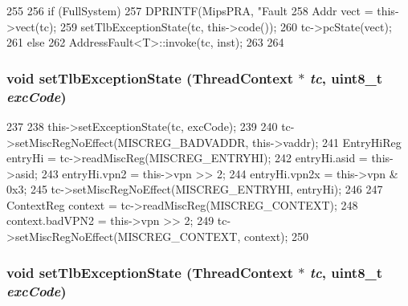 \begin{DoxyCode}
255     {
256         if (FullSystem) {
257             DPRINTF(MipsPRA, "Fault %
258             Addr vect = this->vect(tc);
259             setTlbExceptionState(tc, this->code());
260             tc->pcState(vect);
261         } else {
262             AddressFault<T>::invoke(tc, inst);
263         }
264     }
\end{DoxyCode}
\hypertarget{classMipsISA_1_1TlbFault_a063e32df265a515397ce13a84a741fed}{
\subsubsection[{setTlbExceptionState}]{\setlength{\rightskip}{0pt plus 5cm}void setTlbExceptionState ({\bf ThreadContext} $\ast$ {\em tc}, \/  uint8\_\-t {\em excCode})}}
\label{classMipsISA_1_1TlbFault_a063e32df265a515397ce13a84a741fed}



\begin{DoxyCode}
237     {
238         this->setExceptionState(tc, excCode);
239 
240         tc->setMiscRegNoEffect(MISCREG_BADVADDR, this->vaddr);
241         EntryHiReg entryHi = tc->readMiscReg(MISCREG_ENTRYHI);
242         entryHi.asid = this->asid;
243         entryHi.vpn2 = this->vpn >> 2;
244         entryHi.vpn2x = this->vpn & 0x3;
245         tc->setMiscRegNoEffect(MISCREG_ENTRYHI, entryHi);
246 
247         ContextReg context = tc->readMiscReg(MISCREG_CONTEXT);
248         context.badVPN2 = this->vpn >> 2;
249         tc->setMiscRegNoEffect(MISCREG_CONTEXT, context);
250     }
\end{DoxyCode}
\hypertarget{classMipsISA_1_1TlbFault_a063e32df265a515397ce13a84a741fed}{
\subsubsection[{setTlbExceptionState}]{\setlength{\rightskip}{0pt plus 5cm}void setTlbExceptionState ({\bf ThreadContext} $\ast$ {\em tc}, \/  uint8\_\-t {\em excCode})}}
\label{classMipsISA_1_1TlbFault_a063e32df265a515397ce13a84a741fed}



